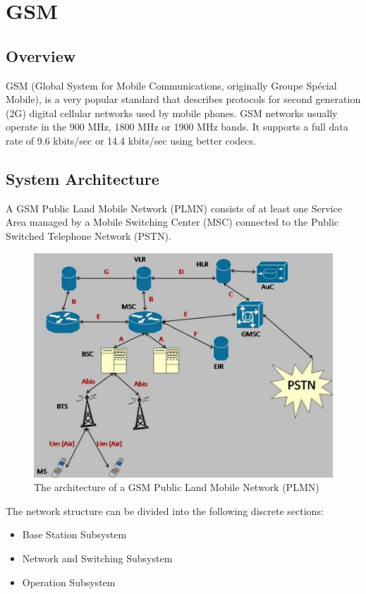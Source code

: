 \chapter{GSM}

\section{Overview}

GSM (Global System for Mobile Communications, originally Groupe Sp\'ecial 
Mobile), is a very popular standard that describes protocols for second 
generation (2G) digital cellular networks used by mobile phones. GSM networks 
usually operate in the 900 MHz, 1800 MHz or 1900 MHz bands. It supports a full
data rate of 9.6 kbits/sec or 14.4 kbits/sec using better codecs.


\section{System Architecture}

A GSM Public Land Mobile Network (PLMN) consists of at least one Service Area
managed by a Mobile Switching Center (MSC) connected to the Public Switched 
Telephone Network  (PSTN).

\begin{figure}
\centering
\includegraphics[scale=0.5]{gsmNetwork}
\caption[GSM PLMN architecture]{The architecture of a GSM Public Land Mobile 
Network (PLMN) {\cite{gnuradioFullNet}}}
\end{figure}

The network structure can be divided into the following discrete sections:
\begin{itemize}[noitemsep,topsep=0pt,parsep=0pt,partopsep=0pt]
\item Base Station Subsystem
\item Network and Switching Subsystem
\item Operation Subsystem
\end{itemize}


